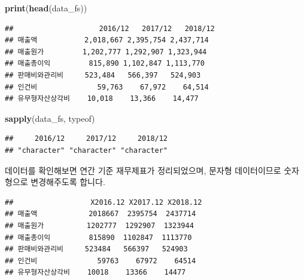 \documentclass[12pt,]{book}
\newenvironment{Shaded}{\begin{snugshade}}{\end{snugshade}}
\newcommand{\ControlFlowTok}[1]{\textcolor[rgb]{0.13,0.29,0.53}{\textbf{#1}}}
\newcommand{\DataTypeTok}[1]{\textcolor[rgb]{0.13,0.29,0.53}{#1}}
\newcommand{\KeywordTok}[1]{\textcolor[rgb]{0.13,0.29,0.53}{\textbf{#1}}}
\newcommand{\NormalTok}[1]{#1}
\newcommand{\OperatorTok}[1]{\textcolor[rgb]{0.81,0.36,0.00}{\textbf{#1}}}
\newcommand{\StringTok}[1]{\textcolor[rgb]{0.31,0.60,0.02}{#1}}
\begin{document}
\begin{Shaded}
\begin{Highlighting}[]
\KeywordTok{print}\NormalTok{(}\KeywordTok{head}\NormalTok{(data_fs))}
\end{Highlighting}
\end{Shaded}

\begin{verbatim}
##                    2016/12   2017/12   2018/12
## 매출액           2,018,667 2,395,754 2,437,714
## 매출원가         1,202,777 1,292,907 1,323,944
## 매출총이익         815,890 1,102,847 1,113,770
## 판매비와관리비     523,484   566,397   524,903
## 인건비              59,763    67,972    64,514
## 유무형자산상각비    10,018    13,366    14,477
\end{verbatim}

\begin{Shaded}
\begin{Highlighting}[]
\KeywordTok{sapply}\NormalTok{(data_fs, typeof)}
\end{Highlighting}
\end{Shaded}

\begin{verbatim}
##     2016/12     2017/12     2018/12 
## "character" "character" "character"
\end{verbatim}

데이터를 확인해보면 연간 기준 재무제표가 정리되었으며, 문자형 데이터이므로 숫자형으로 변경해주도록 합니다.

\begin{Shaded}
\end{Shaded}

\begin{verbatim}
##                  X2016.12 X2017.12 X2018.12
## 매출액            2018667  2395754  2437714
## 매출원가          1202777  1292907  1323944
## 매출총이익         815890  1102847  1113770
## 판매비와관리비     523484   566397   524903
## 인건비              59763    67972    64514
## 유무형자산상각비    10018    13366    14477
\end{verbatim}
\end{document}
